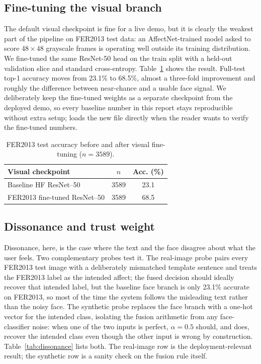 \documentclass[sigconf,nonacm]{acmart}
\begin{document}
\subsection{Fine-tuning the visual branch}
The default visual checkpoint is fine for a live demo, but it is clearly the weakest part of the pipeline on FER2013 test data: an AffectNet-trained model asked to score 48$\!\times\!48$ grayscale frames is operating well outside its training distribution. We fine-tuned the same ResNet-50 head on the  train split with a held-out validation slice and standard cross-entropy. Table~\ref{tab:finetune} shows the result. Full-test top-1 accuracy moves from 23.1\% to 68.5\%, almost a three-fold improvement and roughly the difference between near-chance and a usable face signal. We deliberately keep the fine-tuned weights as a separate checkpoint from the deployed demo, so every baseline number in this report stays reproducible without extra setup;  loads the new file directly when the reader wants to verify the fine-tuned numbers.

\begin{table}[t]
  \centering
  \small
  \caption{FER2013 test accuracy before and after visual fine-tuning ($n=3589$).}
  \label{tab:finetune}
  \begin{tabular}{@{}lcc@{}}
    \toprule
    \textbf{Visual checkpoint} & \textbf{$n$} & \textbf{Acc. (\%)} \\
    \midrule
    Baseline HF ResNet--50 & 3589 & 23.1 \\
    FER2013 fine-tuned ResNet--50 & 3589 & 68.5 \\
    \bottomrule
  \end{tabular}
\end{table}

\subsection{Dissonance and trust weight}
Dissonance, here, is the case where the text and the face disagree about what the user feels. Two complementary probes test it. The real-image probe pairs every FER2013 test image with a deliberately mismatched template sentence and treats the FER2013 label as the intended affect; the fused decision should ideally recover that intended label, but the baseline face branch is only 23.1\% accurate on FER2013, so most of the time the system follows the misleading text rather than the noisy face. The synthetic probe replaces the face branch with a one-hot vector for the intended class, isolating the fusion arithmetic from any face-classifier noise: when one of the two inputs is perfect, $\alpha\!=\!0.5$ should, and does, recover the intended class even though the other input is wrong by construction. Table~\ref{tab:dissonance} lists both. The real-image row is the deployment-relevant result; the synthetic row is a sanity check on the fusion rule itself.
\end{document}
